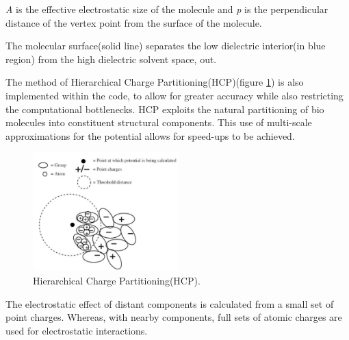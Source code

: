 \par{\emph{A} is the effective electrostatic size of the molecule and \emph{p} is the perpendicular 
    distance of the vertex point from the surface of the molecule.}

\par{The molecular surface(solid line) separates the low dielectric interior(\in in blue region) 
    from the high dielectric solvent space, \in out.}


\par{The method of Hierarchical Charge Partitioning(HCP)(figure \ref{hpc}) is also implemented within the code, 
    to allow for greater accuracy while also restricting the computational bottlenecks. 
    HCP exploits the natural partitioning of bio molecules into constituent structural components. 
    This use of multi-scale approximations for the potential allows for speed-ups to be achieved.}

\begin{figure}[!h]
    \centering
    \includegraphics[width=0.5\textwidth]{figures/hpc.png}
    \caption{Hierarchical Charge Partitioning(HCP)\cite{nbody_gpu}.}
    \label{hpc}
\end{figure}

\par{The electrostatic effect of distant components is calculated from a small set of point charges. 
    Whereas, with nearby components, full sets of atomic charges are used for electrostatic interactions.}





